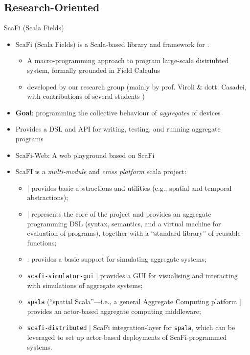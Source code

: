 \documentclass[presentation, 9pt]{beamer}\mode<presentation>{\usetheme{AMSBolognaFC}}
\begin{document}
\subsection{Research-Oriented}
\begin{frame}{ScaFi (Scala Fields)}
\begin{itemize}
	\item ScaFi (Scala Fields) is a Scala-based library and framework for .
	\begin{itemize}
		\item A macro-programming approach to program large-scale distriubted system, formally grounded in Field Calculus
		\item developed by our research group (mainly by prof. Viroli \& dott. Casadei, with contributions of several students \href{https://github.com/scafi/scafi/graphs/contributors}{\faLink})
	\end{itemize}
	\item \textbf{Goal}: programming the collective behaviour of \emph{aggregates} of devices
 	\item Provides a DSL and API for writing, testing, and running aggregate programs
  \item ScaFi-Web: A web playground based on ScaFi \href{https://scafi.github.io/web/}{\faLink}
	\item ScaFI is a \emph{multi-module} and \emph{cross platform} scala project:
	\begin{itemize}
		\item \texttt{} | provides basic abstractions and utilities (e.g., spatial and temporal abstractions);
		\item \texttt{} | represents the core of the project and provides an aggregate programming DSL (syntax, semantics, and a virtual machine for evaluation of programs), together with a ``standard library'' of reusable functions;
		\item \texttt{}: provides a basic support for simulating aggregate systems;
		\item \texttt{scafi-simulator-gui} | provides a GUI for visualising and interacting with simulations of aggregate systems;
		\item \texttt{spala} (``spatial Scala''---i.e., a general Aggregate Computing platform | provides an actor-based aggregate computing middleware;
		\item \texttt{scafi-distributed} |  ScaFi integration-layer for \texttt{spala}, which can be leveraged to set up actor-based deployments of ScaFi-programmed systems.
		\end{itemize}
\end{itemize}


\end{frame}
\end{document}
